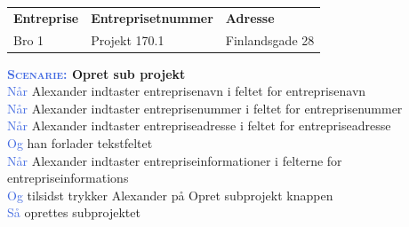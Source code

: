 \begin{tabular}{| l | l | l |}
	\textbf{Entreprise} & \textbf{Entreprisetnummer} & \textbf{Adresse} \\
	Bro 1 & Projekt 170.1 & Finlandsgade 28 
\end{tabular}
\newline

\textbf{\textsc{\textcolor{RoyalBlue}{Scenarie:}} Opret sub projekt}\\
\textcolor{RoyalBlue}{Når} Alexander indtaster entreprisenavn i feltet for entreprisenavn\\
\textcolor{RoyalBlue}{Når} Alexander indtaster entreprisenummer i feltet for entreprisenummer\\
\textcolor{RoyalBlue}{Når} Alexander indtaster entrepriseadresse i feltet for entrepriseadresse\\
\textcolor{RoyalBlue}{Og} han forlader tekstfeltet\\
\textcolor{RoyalBlue}{Når} Alexander indtaster entrepriseinformationer i felterne for entrepriseinformations\\
\textcolor{RoyalBlue}{Og} tilsidst trykker Alexander på Opret subprojekt knappen\\
\textcolor{RoyalBlue}{Så} oprettes subprojektet \\
